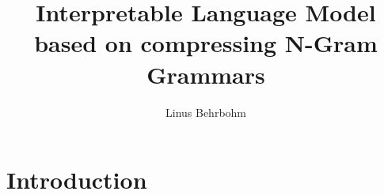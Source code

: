 \documentclass[11pt]{report}
\title{Interpretable Language Model based on compressing N-Gram Grammars}
\author{Linus Behrbohm}
\begin{document}
\maketitle

\renewcommand*\contentsname{Outline}
\tableofcontents

\newpage

\chapter{Introduction}





\end{document}
